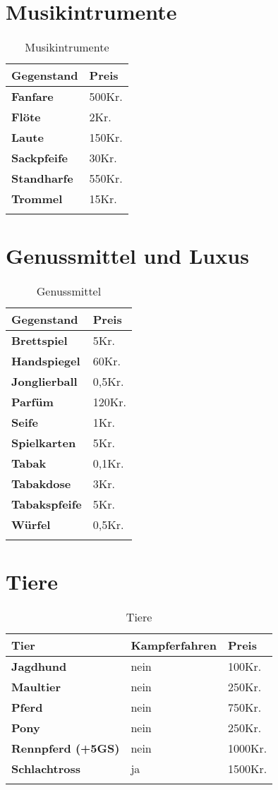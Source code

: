 \section{Musikintrumente}
\begin{longtable}{|p{5cm}|p{2cm}|}
\hline
\textbf{Gegenstand} & \textbf{Preis} \\ \hline
\textbf{Fanfare} & 500Kr. \\ \hline
\textbf{Flöte} & 2Kr. \\ \hline
\textbf{Laute} & 150Kr. \\ \hline
\textbf{Sackpfeife} & 30Kr. \\ \hline
\textbf{Standharfe} & 550Kr. \\ \hline
\textbf{Trommel} & 15Kr. \\ \hline

\caption{Musikintrumente}
\label{tab:Musikintrumente}
\end{longtable}


\section{Genussmittel und Luxus}
\begin{longtable}{|p{5cm}|p{2cm}|}
\hline
\textbf{Gegenstand} & \textbf{Preis} \\ \hline
\textbf{Brettspiel} & 5Kr. \\ \hline
\textbf{Handspiegel} & 60Kr. \\ \hline
\textbf{Jonglierball} & 0,5Kr. \\ \hline
\textbf{Parfüm} & 120Kr. \\ \hline
\textbf{Seife} & 1Kr. \\ \hline
\textbf{Spielkarten} & 5Kr. \\ \hline
\textbf{Tabak} & 0,1Kr. \\ \hline
\textbf{Tabakdose} & 3Kr. \\ \hline
\textbf{Tabakspfeife} & 5Kr. \\ \hline
\textbf{Würfel} & 0,5Kr. \\ \hline

\caption{Genussmittel}
\label{tab:Genussmittel}
\end{longtable}


\section{Tiere}
\begin{longtable}{|p{5cm}|p{4cm}|p{2cm}|}
\hline
\textbf{Tier} & \textbf{Kampferfahren} & \textbf{Preis} \\ \hline
\textbf{Jagdhund} & nein & 100Kr. \\ \hline
\textbf{Maultier} & nein & 250Kr. \\ \hline
\textbf{Pferd} & nein & 750Kr. \\ \hline
\textbf{Pony} & nein & 250Kr. \\ \hline
\textbf{Rennpferd (+5GS)} & nein & 1000Kr. \\ \hline
\textbf{Schlachtross} & ja & 1500Kr. \\ \hline

\caption{Tiere}
\label{tab:Tiere}
\end{longtable}

